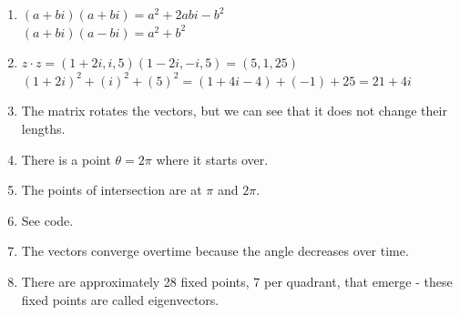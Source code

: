 \documentclass{article}
\begin{document}
\begin{enumerate}
	\item $(a+bi)(a+bi) = a^2 + 2abi - b^2$\\
	$(a+bi)(a-bi) = a^2 + b^2$
	
	\item $z \cdot z = (1+2i, i, 5)(1-2i, -i, 5) = (5, 1, 25)$\\
	$(1+2i)^2 + (i)^2 + (5)^2 = (1+4i-4) + (-1) + 25 = 21+4i$
	
	\item The matrix rotates the vectors, but we can see that it does not change their lengths. 
	
	\item There is a point $\theta = 2\pi$ where it starts over.
	
	\item The points of intersection are at $\pi$ and $2\pi$.  
	
	\item See code. 
	
	\item The vectors converge overtime because the angle decreases over time. 
	
	\item There are approximately 28 fixed points, 7 per quadrant, that emerge - these fixed points are called eigenvectors. 
\end{enumerate}
	
\end{document}
